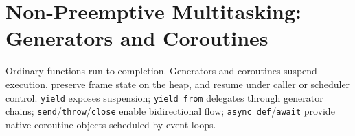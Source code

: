 \section{Non-Preemptive Multitasking: Generators and Coroutines}

Ordinary functions run to completion. Generators and coroutines suspend execution, preserve frame state on the heap, and resume under caller or scheduler control. \texttt{yield} exposes suspension; \texttt{yield from} delegates through generator chains; \texttt{send}/\texttt{throw}/\texttt{close} enable bidirectional flow; \texttt{async def}/\texttt{await} provide native coroutine objects scheduled by event loops.
